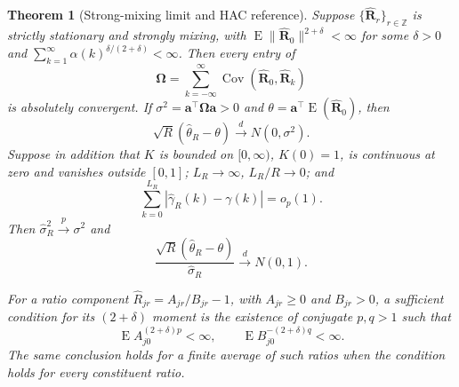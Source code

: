 \documentclass[namedate,webpdf,modern,mediumone]{oup-authoring-template}
\theoremstyle{thmstyleone}
\newtheorem{theorem}{Theorem}
\begin{document}
\begin{theorem}[Strong-mixing limit and HAC reference]
\label{thm:s-process}
Suppose $\{\widehat{\boldsymbol R}_r\}_{r\in\mathbb Z}$ is strictly
stationary and strongly mixing, with
$\operatorname E\lVert\widehat{\boldsymbol R}_0\rVert^{2+\delta}<\infty$
for some $\delta>0$ and
$\sum_{k=1}^{\infty}\alpha(k)^{\delta/(2+\delta)}<\infty$.
Then every entry of
\[
 \boldsymbol\Omega=\sum_{k=-\infty}^{\infty}
 \operatorname{Cov}(\widehat{\boldsymbol R}_0,
                    \widehat{\boldsymbol R}_k)
\]
is absolutely convergent. If
$\sigma^2=\boldsymbol a^\top\boldsymbol\Omega\boldsymbol a>0$ and
$\theta=\boldsymbol a^\top
\operatorname E(\widehat{\boldsymbol R}_0)$, then
\[
 \sqrt R(\widehat\theta_R-\theta)
 \overset d\longrightarrow N(0,\sigma^2).
\]
Suppose in addition that $K$ is bounded on $[0,\infty)$, $K(0)=1$, is
continuous at zero and vanishes outside $[0,1]$; $L_R\to\infty$,
$L_R/R\to0$; and
\begin{equation}
 \sum_{k=0}^{L_R}
 |\widehat\gamma_R(k)-\gamma(k)|=o_p(1).
 \label{eq:s-hac-uniform}
\end{equation}
Then $\widehat\sigma_R^2\overset p\longrightarrow\sigma^2$ and
\[
 \frac{\sqrt R(\widehat\theta_R-\theta)}{\widehat\sigma_R}
 \overset d\longrightarrow N(0,1).
\]

For a ratio component
$\widehat R_{jr}=A_{jr}/B_{jr}-1$, with $A_{jr}\geq0$ and $B_{jr}>0$, a
sufficient condition for its $(2+\delta)$ moment is the existence of
conjugate $p,q>1$ such that
\[
 \operatorname E A_{j0}^{(2+\delta)p}<\infty,
 \qquad
 \operatorname E B_{j0}^{-(2+\delta)q}<\infty.
 \label{eq:s-ratio-moments}
\]
The same conclusion holds for a finite average of such ratios when the
condition holds for every constituent ratio.
\end{theorem}
\end{document}
